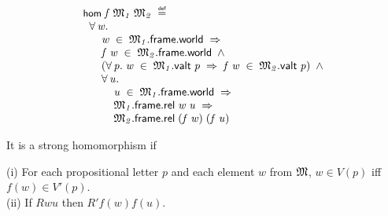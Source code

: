 \documentclass[letterpaper]{article}
\renewcommand{\HOLConst}[1]{{\textsf{\upshape\small #1}}}
\renewcommand{\HOLinline}[1]{\ensuremath{#1}}
\newenvironment{holmath}{\begin{displaymath}\begin{array}{l}}{\end{array}\end{displaymath}\ignorespacesafterend}
\begin{document}
\begin{holmath}
  \HOLConst{hom}\;\HOLFreeVar{f}\;\HOLFreeVar{\ensuremath{\mathfrak{M}\sb{1}}}\;\HOLFreeVar{\ensuremath{\mathfrak{M}\sb{2}}}\;\HOLSymConst{\HOLTokenDefEquality{}}\\
\;\;\HOLSymConst{\HOLTokenForall{}}\HOLBoundVar{w}.\\
\;\;\;\;\;\;\HOLBoundVar{w}\;\HOLSymConst{\HOLTokenIn{}}\;\HOLFreeVar{\ensuremath{\mathfrak{M}\sb{1}}}.\HOLFieldName{frame}.\HOLFieldName{world}\;\HOLSymConst{\HOLTokenImp{}}\\
\;\;\;\;\;\;\HOLFreeVar{f}\;\HOLBoundVar{w}\;\HOLSymConst{\HOLTokenIn{}}\;\HOLFreeVar{\ensuremath{\mathfrak{M}\sb{2}}}.\HOLFieldName{frame}.\HOLFieldName{world}\;\HOLSymConst{\HOLTokenConj{}}\\
\;\;\;\;\;\;(\HOLSymConst{\HOLTokenForall{}}\HOLBoundVar{p}.\;\HOLBoundVar{w}\;\HOLSymConst{\HOLTokenIn{}}\;\HOLFreeVar{\ensuremath{\mathfrak{M}\sb{1}}}.\HOLFieldName{valt}\;\HOLBoundVar{p}\;\HOLSymConst{\HOLTokenImp{}}\;\HOLFreeVar{f}\;\HOLBoundVar{w}\;\HOLSymConst{\HOLTokenIn{}}\;\HOLFreeVar{\ensuremath{\mathfrak{M}\sb{2}}}.\HOLFieldName{valt}\;\HOLBoundVar{p})\;\HOLSymConst{\HOLTokenConj{}}\\
\;\;\;\;\;\;\HOLSymConst{\HOLTokenForall{}}\HOLBoundVar{u}.\\
\;\;\;\;\;\;\;\;\;\;\HOLBoundVar{u}\;\HOLSymConst{\HOLTokenIn{}}\;\HOLFreeVar{\ensuremath{\mathfrak{M}\sb{1}}}.\HOLFieldName{frame}.\HOLFieldName{world}\;\HOLSymConst{\HOLTokenImp{}}\\
\;\;\;\;\;\;\;\;\;\;\HOLFreeVar{\ensuremath{\mathfrak{M}\sb{1}}}.\HOLFieldName{frame}.\HOLFieldName{rel}\;\HOLBoundVar{w}\;\HOLBoundVar{u}\;\HOLSymConst{\HOLTokenImp{}}\\
\;\;\;\;\;\;\;\;\;\;\HOLFreeVar{\ensuremath{\mathfrak{M}\sb{2}}}.\HOLFieldName{frame}.\HOLFieldName{rel}\;(\HOLFreeVar{f}\;\HOLBoundVar{w})\;(\HOLFreeVar{f}\;\HOLBoundVar{u})
\end{holmath}

It is a strong homomorphism if

(i) For each propositional letter $p$ and each element $w$ from \HOLinline{\HOLFreeVar{\ensuremath{\mathfrak{M}}}}, $w\in V(p)$ iff $f(w) \in V'(p)$.\\
(ii) If $Rwu$ then $R'f(w)f(u)$.
\end{document}

